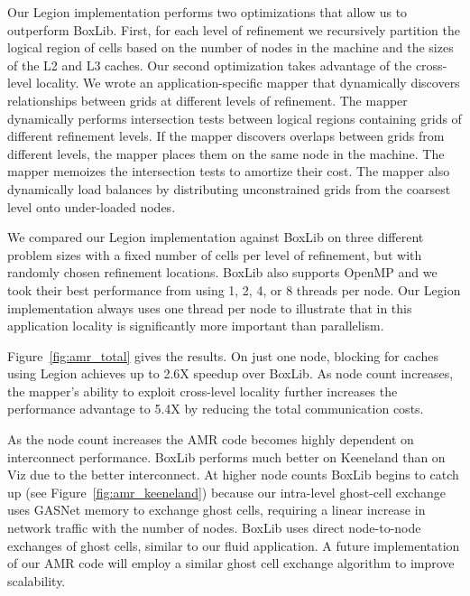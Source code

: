 Our Legion implementation performs two optimizations that allow us to
outperform BoxLib.  First, for each level of
refinement we recursively partition the logical region of cells based
on the number of nodes in the machine and the sizes of the L2 and L3 caches.
Our second optimization takes advantage of the cross-level locality.
We wrote an application-specific mapper that dynamically discovers
relationships between grids at different levels of refinement.  The
mapper dynamically performs intersection tests between logical regions
containing grids of different refinement levels.  If the mapper
discovers overlaps between grids from different levels, the mapper
places them on the same node in the machine.  The
mapper memoizes the intersection tests to amortize their cost.  The
mapper also dynamically load balances by distributing unconstrained
grids from the coarsest level onto under-loaded nodes.

We compared our Legion implementation against BoxLib on three
different problem sizes with a fixed number of cells per level of
refinement, but with randomly chosen refinement locations.  BoxLib
also supports OpenMP and we took their best performance from using 1,
2, 4, or 8 threads per node.  Our Legion implementation always uses
one thread per node to illustrate that in this application locality is
significantly more important than parallelism.  

Figure~\ref{fig:amr_total} gives the results.
On just one node, blocking for caches using Legion achieves up to 2.6X
speedup over BoxLib.  As node count increases, the mapper's
ability to exploit cross-level locality further increases
the performance advantage to 5.4X by reducing the total
communication costs.

As the node count increases the AMR code becomes highly dependent on
interconnect performance.  BoxLib performs much better on Keeneland
than on Viz due to the better interconnect.  
At higher node counts BoxLib
begins to catch up (see Figure~\ref{fig:amr_keeneland})
because our intra-level ghost-cell exchange 
uses GASNet memory to exchange ghost cells, requiring a
linear increase in network traffic with the number of nodes.  BoxLib
uses direct node-to-node exchanges of ghost cells, similar to
our fluid application.  A future implementation of our AMR code will
employ a similar ghost cell exchange algorithm to improve scalability.

